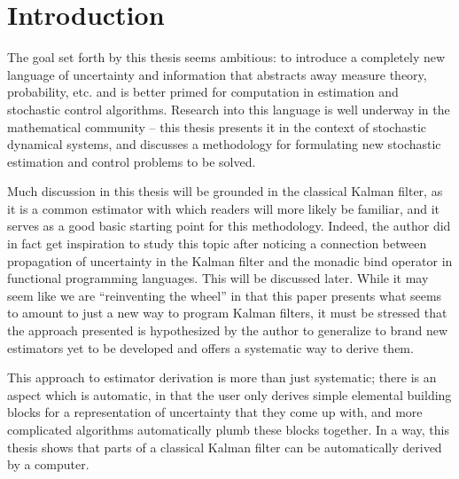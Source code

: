 \chapter{Introduction}

The goal set forth by this thesis seems ambitious: to introduce a completely new language of uncertainty and information that abstracts away measure theory, probability, etc. and is better primed for computation in estimation and stochastic control algorithms.
Research into this language is well underway in the mathematical community -- this thesis presents it in the context of stochastic dynamical systems, and discusses a methodology for formulating new stochastic estimation and control problems to be solved.

Much discussion in this thesis will be grounded in the classical Kalman filter, as it is a common estimator with which readers will more likely be familiar, and it serves as a good basic starting point for this methodology.
Indeed, the author did in fact get inspiration to study this topic after noticing a connection between propagation of uncertainty in the Kalman filter and the monadic bind operator in functional programming languages. This will be discussed later. While it may seem like we are ``reinventing the wheel'' in that this paper presents what seems to amount to just a new way to program Kalman filters, it must be stressed that the approach presented is hypothesized by the author to generalize to brand new estimators yet to be developed and offers a systematic way to derive them.

This approach to estimator derivation is more than just systematic; there is an aspect which is automatic, in that the user only derives simple elemental building blocks for a representation of uncertainty that they come up with, and more complicated algorithms automatically plumb these blocks together. In a way, this thesis shows that parts of a classical Kalman filter can be automatically derived by a computer.


